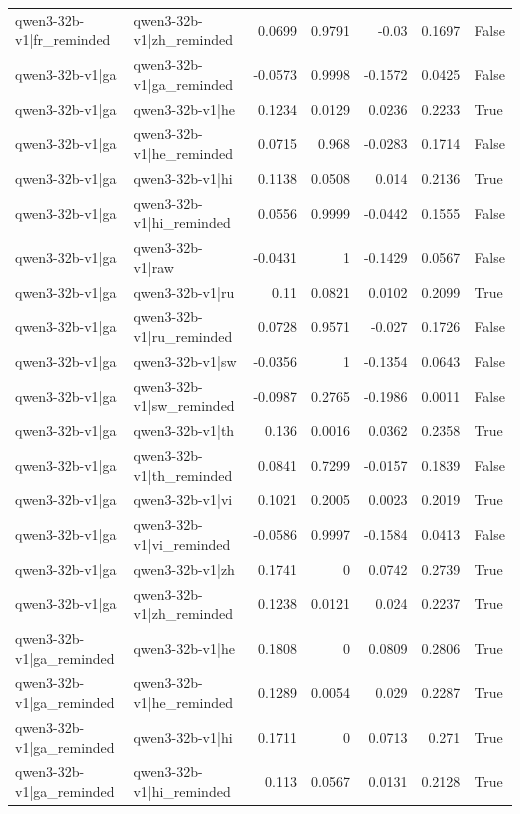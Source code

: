 \begin{table}
\begin{tabular}{l l r r r r l}
qwen3-32b-v1|fr_reminded & qwen3-32b-v1|zh_reminded & 0.0699 & 0.9791 & -0.03 & 0.1697 & False \\
qwen3-32b-v1|ga & qwen3-32b-v1|ga_reminded & -0.0573 & 0.9998 & -0.1572 & 0.0425 & False \\
qwen3-32b-v1|ga & qwen3-32b-v1|he & 0.1234 & 0.0129 & 0.0236 & 0.2233 & True \\
qwen3-32b-v1|ga & qwen3-32b-v1|he_reminded & 0.0715 & 0.968 & -0.0283 & 0.1714 & False \\
qwen3-32b-v1|ga & qwen3-32b-v1|hi & 0.1138 & 0.0508 & 0.014 & 0.2136 & True \\
qwen3-32b-v1|ga & qwen3-32b-v1|hi_reminded & 0.0556 & 0.9999 & -0.0442 & 0.1555 & False \\
qwen3-32b-v1|ga & qwen3-32b-v1|raw & -0.0431 & 1 & -0.1429 & 0.0567 & False \\
qwen3-32b-v1|ga & qwen3-32b-v1|ru & 0.11 & 0.0821 & 0.0102 & 0.2099 & True \\
qwen3-32b-v1|ga & qwen3-32b-v1|ru_reminded & 0.0728 & 0.9571 & -0.027 & 0.1726 & False \\
qwen3-32b-v1|ga & qwen3-32b-v1|sw & -0.0356 & 1 & -0.1354 & 0.0643 & False \\
qwen3-32b-v1|ga & qwen3-32b-v1|sw_reminded & -0.0987 & 0.2765 & -0.1986 & 0.0011 & False \\
qwen3-32b-v1|ga & qwen3-32b-v1|th & 0.136 & 0.0016 & 0.0362 & 0.2358 & True \\
qwen3-32b-v1|ga & qwen3-32b-v1|th_reminded & 0.0841 & 0.7299 & -0.0157 & 0.1839 & False \\
qwen3-32b-v1|ga & qwen3-32b-v1|vi & 0.1021 & 0.2005 & 0.0023 & 0.2019 & True \\
qwen3-32b-v1|ga & qwen3-32b-v1|vi_reminded & -0.0586 & 0.9997 & -0.1584 & 0.0413 & False \\
qwen3-32b-v1|ga & qwen3-32b-v1|zh & 0.1741 & 0 & 0.0742 & 0.2739 & True \\
qwen3-32b-v1|ga & qwen3-32b-v1|zh_reminded & 0.1238 & 0.0121 & 0.024 & 0.2237 & True \\
qwen3-32b-v1|ga_reminded & qwen3-32b-v1|he & 0.1808 & 0 & 0.0809 & 0.2806 & True \\
qwen3-32b-v1|ga_reminded & qwen3-32b-v1|he_reminded & 0.1289 & 0.0054 & 0.029 & 0.2287 & True \\
qwen3-32b-v1|ga_reminded & qwen3-32b-v1|hi & 0.1711 & 0 & 0.0713 & 0.271 & True \\
qwen3-32b-v1|ga_reminded & qwen3-32b-v1|hi_reminded & 0.113 & 0.0567 & 0.0131 & 0.2128 & True \\

\end{tabular}
\end{table}
